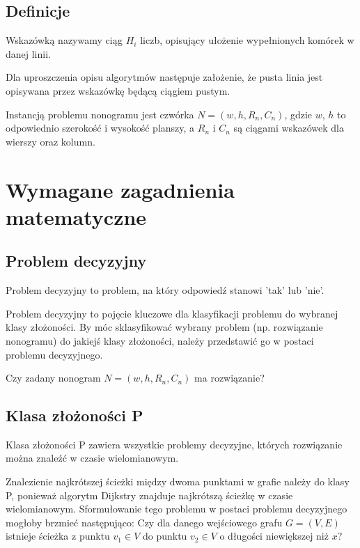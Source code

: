 \subsection{Definicje}
\begin{definition}
    Wskazówką nazywamy ciąg $H_i$ liczb, opisujący ułożenie wypełnionych komórek w danej linii.
\end{definition}
\begin{remark}
    Dla uproszczenia opisu algorytmów następuje założenie, że pusta linia jest opisywana przez
wskazówkę będącą ciągiem pustym.
\end{remark}
\begin{definition}
    Instancją problemu nonogramu jest czwórka $N = (w, h, R_n, C_n)$, gdzie $w$, $h$ to odpowiednio
szerokość i wysokość planszy, a $R_n$ i $C_n$ są ciągami wskazówek dla wierszy oraz kolumn.
\end{definition}



\section{Wymagane zagadnienia matematyczne}


\subsection{Problem decyzyjny}
\begin{definition}
    Problem decyzyjny to problem, na który odpowiedź stanowi 'tak' lub 'nie'.
\end{definition}
    Problem decyzyjny to pojęcie kluczowe dla klasyfikacji problemu do wybranej klasy złożoności.
By móc sklasyfikować wybrany problem (np. rozwiązanie nonogramu) do jakiejś klasy złożoności,
należy przedstawić go w postaci problemu decyzyjnego.
\begin{example}
    Czy zadany nonogram $N = (w, h, R_n, C_n)$ ma rozwiązanie?
\end{example}


\subsection{Klasa złożoności P}
\begin{definition}
    Klasa złożoności P zawiera wszystkie problemy decyzyjne, których rozwiązanie można znaleźć w czasie wielomianowym.
\end{definition}
\begin{example}
    Znalezienie najkrótszej ścieżki między dwoma punktami w grafie należy do klasy P, ponieważ
algorytm Dijkstry znajduje najkrótszą ścieżkę w czasie wielomianowym. Sformułowanie tego problemu
w postaci problemu decyzyjnego mogłoby brzmieć następująco: Czy dla danego wejściowego grafu $G = (V, E)$
istnieje ścieżka z punktu $v_1 \in V$ do punktu $v_2 \in V$ o długości niewiększej niż $x$?
\end{example}



